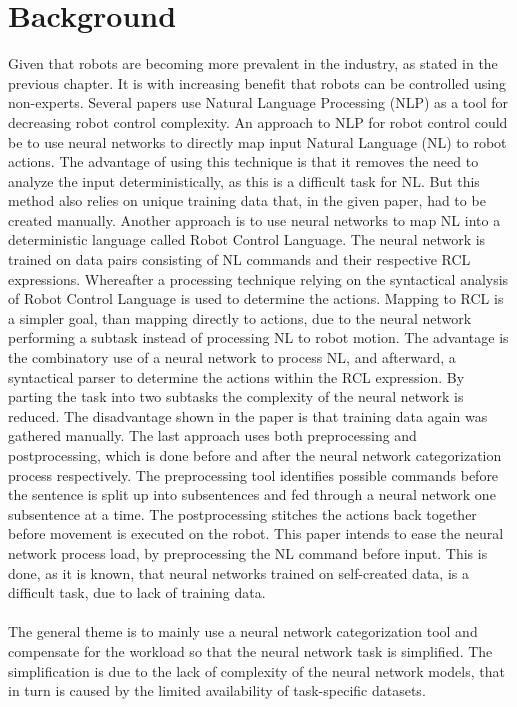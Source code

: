 \chapter{Background} \label{ch:background}
Given that robots are becoming more prevalent in the industry, as stated in the previous chapter. It is with increasing benefit that robots can be controlled using non-experts. Several papers use Natural Language Processing (NLP) as a tool for decreasing robot control complexity. 
An approach to NLP for robot control could be to use neural networks to directly map input Natural Language (NL) to robot actions\cite{Method1}. The advantage of using this technique is that it removes the need to analyze the input deterministically, as this is a difficult task for NL. But this method also relies on unique training data that, in the given paper, had to be created manually.
Another approach is to use neural networks to map NL into a deterministic language called Robot Control Language\cite{Method2}. The neural network is trained on data pairs consisting of NL commands and their respective RCL expressions. Whereafter a processing technique relying on the syntactical analysis of Robot Control Language is used to determine the actions. Mapping to RCL is a simpler goal, than mapping directly to actions, due to the neural network performing a subtask instead of processing NL to robot motion. The advantage is the combinatory use of a neural network to process NL, and afterward, a syntactical parser to determine the actions within the RCL expression. By parting the task into two subtasks the complexity of the neural network is reduced. The disadvantage shown in the paper is that training data again was gathered manually.
The last approach uses both preprocessing and postprocessing, which is done before and after the neural network categorization process respectively\cite{Method3}. The preprocessing tool identifies possible commands before the sentence is split up into subsentences and fed through a neural network one subsentence at a time. The postprocessing stitches the actions back together before movement is executed on the robot. This paper intends to ease the neural network process load, by preprocessing the NL command before input. This is done, as it is known, that neural networks trained on self-created data, is a difficult task, due to lack of training data. 
\\\\
The general theme is to mainly use a neural network categorization tool and compensate for the workload so that the neural network task is simplified. The simplification is due to the lack of complexity of the neural network models, that in turn is caused by the limited availability of task-specific datasets.
